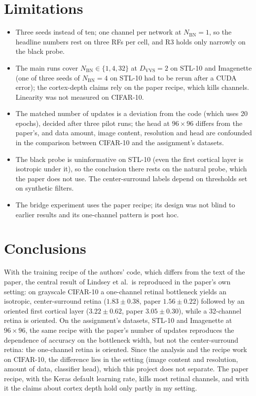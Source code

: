 \documentclass[11pt,a4paper]{article}
\newcommand{\NBN}{N_{\mathrm{BN}}}
\newcommand{\DVVS}{D_{\mathrm{VVS}}}
\begin{document}
\section{Limitations}\label{sec:lim}
\begin{itemize}
\item Three seeds instead of ten; one channel per network at $\NBN=1$, so the headline numbers rest on three RFs per cell, and R3 holds only narrowly on the black probe.
\item The main runs cover $\NBN\in\{1,4,32\}$ at $\DVVS=2$ on STL-10 and Imagenette (one of three seeds of $\NBN=4$ on STL-10 had to be rerun after a CUDA error); the cortex-depth claims rely on the paper recipe, which kills channels. Linearity was not measured on CIFAR-10.
\item The matched number of updates is a deviation from the code (which uses 20 epochs), decided after three pilot runs; the head at $96{\times}96$ differs from the paper's, and data amount, image content, resolution and head are confounded in the comparison between CIFAR-10 and the assignment's datasets.
\item The black probe is uninformative on STL-10 (even the first cortical layer is isotropic under it), so the conclusion there rests on the natural probe, which the paper does not use. The center-surround labels depend on thresholds set on synthetic filters.
\item The bridge experiment uses the paper recipe; its design was not blind to earlier results and its one-channel pattern is post hoc.
\end{itemize}

\section{Conclusions}\label{sec:concl}
With the training recipe of the authors' code, which differs from the text of the paper, the central result of Lindsey et al.\ is reproduced in the paper's own setting: on grayscale CIFAR-10 a one-channel retinal bottleneck yields an isotropic, center-surround retina ($1.83\pm0.38$, paper $1.56\pm0.22$) followed by an oriented first cortical layer ($3.22\pm0.62$, paper $3.05\pm0.30$), while a 32-channel retina is oriented. On the assignment's datasets, STL-10 and Imagenette at $96{\times}96$, the same recipe with the paper's number of updates reproduces the dependence of accuracy on the bottleneck width, but not the center-surround retina: the one-channel retina is oriented. Since the analysis and the recipe work on CIFAR-10, the difference lies in the setting (image content and resolution, amount of data, classifier head), which this project does not separate. The paper recipe, with the Keras default learning rate, kills most retinal channels, and with it the claims about cortex depth hold only partly in my setting.
\end{document}
